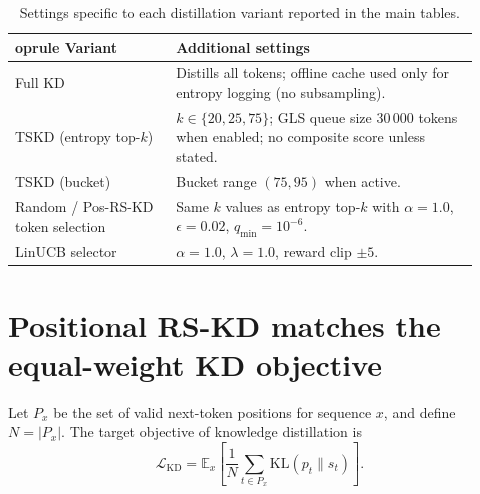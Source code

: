 \documentclass[11pt]{article}
\begin{document}
\begin{table}[h]
	\centering
	\small
	\setlength{\tabcolsep}{8pt}
\begin{tabular}{p{0.32\linewidth}p{0.6\linewidth}}
	oprule
Variant & Additional settings \\
\midrule
Full KD & Distills all tokens; offline cache used only for entropy logging (no subsampling). \\
TSKD (entropy top-$k$) & $k\in\{20,25,75\}$; GLS queue size $30\,000$ tokens when enabled; no composite score unless stated. \\
TSKD (bucket) & Bucket range $(75,95)$ when active. \\
Random / Pos-RS-KD token selection & Same $k$ values as entropy top-$k$ with $\alpha=1.0$, $\epsilon=0.02$, $q_{\min}=10^{-6}$. \\
LinUCB selector & $\alpha=1.0$, $\lambda=1.0$, reward clip $\pm 5$. \\
\bottomrule
\end{tabular}
\caption{Settings specific to each distillation variant reported in the main tables.}
\label{tab:variant-hparams}
\end{table}

\section{Positional RS-KD matches the equal-weight KD objective}
\label{app:pos-rs-kd-proof}

Let \(P_x\) be the set of valid next-token positions for sequence \(x\), and define \(N=\lvert P_x\rvert\).
The target objective of knowledge distillation is
\[
	\mathcal{L}_{\text{KD}}
	=\mathbb{E}_{x}\!\left[\frac{1}{N}\sum_{t\in P_x}\mathrm{KL}(p_t\|s_t)\right].
\]
\end{document}
